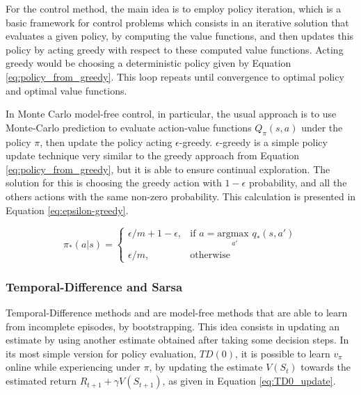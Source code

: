 For the control method, the main idea is to employ policy iteration, which is a basic framework for control problems which consists in an iterative solution that evaluates a given policy, by computing the value functions, and then updates this policy by acting greedy with respect to these computed value functions. Acting greedy would be choosing a deterministic policy given by Equation \eqref{eq:policy_from_greedy}. This loop repeats until convergence to optimal policy and optimal value functions.

In Monte Carlo model-free control, in particular, the usual approach is to use Monte-Carlo prediction to evaluate action-value functions $Q_{\pi}(s,a)$ under the policy $\pi$, then update the policy acting $\epsilon$-greedy. $\epsilon$-greedy is a simple policy update technique very similar to the greedy approach from Equation \eqref{eq:policy_from_greedy}, but it is able to ensure continual exploration. The solution for this is choosing the greedy action with $1-\epsilon$ probability, and all the others actions with the same non-zero probability. This calculation is presented in Equation \eqref{eq:epsilon-greedy}.

\begin{equation}
 \pi_*(a | s) = 
 \begin{cases}
    \epsilon/m + 1 - \epsilon ,& \text{if } a = \underset{a'}{\textrm{argmax }} q_*(s,a')\\
    \epsilon/m ,& \text{otherwise}
 \end{cases}
 \label{eq:epsilon-greedy}
\end{equation}



\subsubsection{Temporal-Difference and Sarsa}

Temporal-Difference methods \cite{Sutton1998} and \cite{TDLearning} are model-free methods that are able to learn from incomplete episodes, by bootstrapping. This idea consists in updating an estimate by using another estimate obtained after taking some decision steps. In its most simple version for policy evaluation, $TD(0)$, it is possible to learn $v_{\pi}$ online while experiencing under $\pi$, by updating the estimate $V(S_t)$ towards the estimated return $R_{t+1} + \gamma V(S_{t+1})$, as given in Equation \eqref{eq:TD0_update}.

